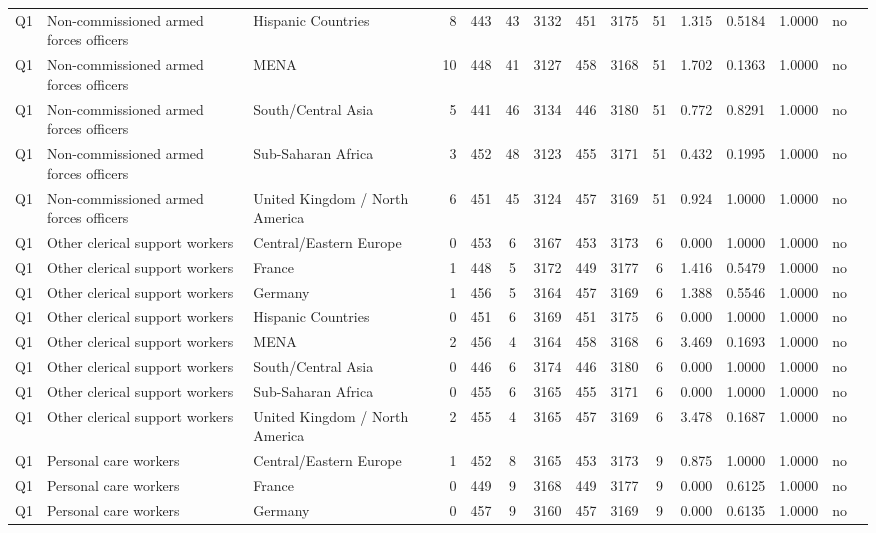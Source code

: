 \begin{longtable}{lllrcccccccccll}
Q1 & Non-commissioned armed forces officers & Hispanic Countries & 8 & 443 & 43 & 3132 & 451 & 3175 & 51 & 1.315 & 0.5184 & 1.0000 & no \\
Q1 & Non-commissioned armed forces officers & MENA & 10 & 448 & 41 & 3127 & 458 & 3168 & 51 & 1.702 & 0.1363 & 1.0000 & no \\
Q1 & Non-commissioned armed forces officers & South/Central Asia & 5 & 441 & 46 & 3134 & 446 & 3180 & 51 & 0.772 & 0.8291 & 1.0000 & no \\
Q1 & Non-commissioned armed forces officers & Sub-Saharan Africa & 3 & 452 & 48 & 3123 & 455 & 3171 & 51 & 0.432 & 0.1995 & 1.0000 & no \\
Q1 & Non-commissioned armed forces officers & United Kingdom / North America & 6 & 451 & 45 & 3124 & 457 & 3169 & 51 & 0.924 & 1.0000 & 1.0000 & no \\
Q1 & Other clerical support workers & Central/Eastern Europe & 0 & 453 & 6 & 3167 & 453 & 3173 & 6 & 0.000 & 1.0000 & 1.0000 & no \\
Q1 & Other clerical support workers & France & 1 & 448 & 5 & 3172 & 449 & 3177 & 6 & 1.416 & 0.5479 & 1.0000 & no \\
Q1 & Other clerical support workers & Germany & 1 & 456 & 5 & 3164 & 457 & 3169 & 6 & 1.388 & 0.5546 & 1.0000 & no \\
Q1 & Other clerical support workers & Hispanic Countries & 0 & 451 & 6 & 3169 & 451 & 3175 & 6 & 0.000 & 1.0000 & 1.0000 & no \\
Q1 & Other clerical support workers & MENA & 2 & 456 & 4 & 3164 & 458 & 3168 & 6 & 3.469 & 0.1693 & 1.0000 & no \\
Q1 & Other clerical support workers & South/Central Asia & 0 & 446 & 6 & 3174 & 446 & 3180 & 6 & 0.000 & 1.0000 & 1.0000 & no \\
Q1 & Other clerical support workers & Sub-Saharan Africa & 0 & 455 & 6 & 3165 & 455 & 3171 & 6 & 0.000 & 1.0000 & 1.0000 & no \\
Q1 & Other clerical support workers & United Kingdom / North America & 2 & 455 & 4 & 3165 & 457 & 3169 & 6 & 3.478 & 0.1687 & 1.0000 & no \\
Q1 & Personal care workers & Central/Eastern Europe & 1 & 452 & 8 & 3165 & 453 & 3173 & 9 & 0.875 & 1.0000 & 1.0000 & no \\
Q1 & Personal care workers & France & 0 & 449 & 9 & 3168 & 449 & 3177 & 9 & 0.000 & 0.6125 & 1.0000 & no \\
Q1 & Personal care workers & Germany & 0 & 457 & 9 & 3160 & 457 & 3169 & 9 & 0.000 & 0.6135 & 1.0000 & no \\

\end{longtable}
